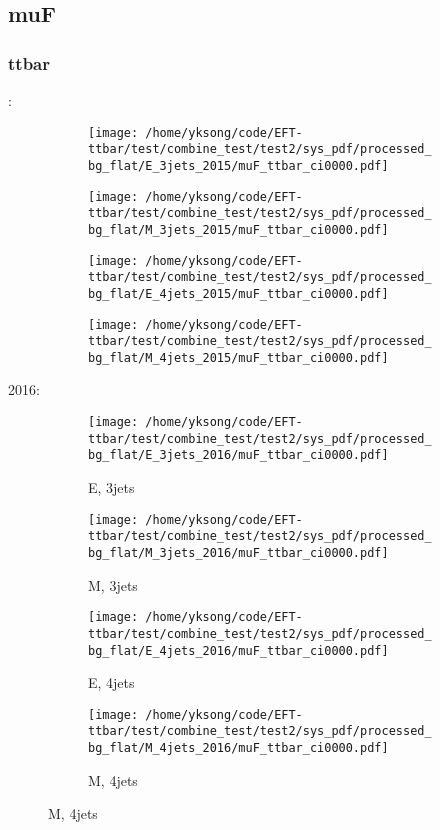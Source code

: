 \documentclass{beamer}
\begin{document}
\subsection{muF}

\begin{frame}
\frametitle{ttbar}
\fontsize{5}{1}:
\begin{figure}
\centering
\begin{subfigure}[b]{0.24\textwidth}
\texttt{[image: /home/yksong/code/EFT-ttbar/test/combine\_test/test2/sys\_pdf/processed\_bg\_flat/E\_3jets\_2015/muF\_ttbar\_ci0000.pdf]}
\end{subfigure}
\begin{subfigure}[b]{0.24\textwidth}
\texttt{[image: /home/yksong/code/EFT-ttbar/test/combine\_test/test2/sys\_pdf/processed\_bg\_flat/M\_3jets\_2015/muF\_ttbar\_ci0000.pdf]}
\end{subfigure}
\begin{subfigure}[b]{0.24\textwidth}
\texttt{[image: /home/yksong/code/EFT-ttbar/test/combine\_test/test2/sys\_pdf/processed\_bg\_flat/E\_4jets\_2015/muF\_ttbar\_ci0000.pdf]}
\end{subfigure}
\begin{subfigure}[b]{0.24\textwidth}
\texttt{[image: /home/yksong/code/EFT-ttbar/test/combine\_test/test2/sys\_pdf/processed\_bg\_flat/M\_4jets\_2015/muF\_ttbar\_ci0000.pdf]}
\end{subfigure}
\end{figure}
2016:
\begin{figure}
\centering
\begin{subfigure}[b]{0.24\textwidth}
\texttt{[image: /home/yksong/code/EFT-ttbar/test/combine\_test/test2/sys\_pdf/processed\_bg\_flat/E\_3jets\_2016/muF\_ttbar\_ci0000.pdf]}
\captionsetup{font=tiny}
\caption{E, 3jets}
\end{subfigure}
\begin{subfigure}[b]{0.24\textwidth}
\texttt{[image: /home/yksong/code/EFT-ttbar/test/combine\_test/test2/sys\_pdf/processed\_bg\_flat/M\_3jets\_2016/muF\_ttbar\_ci0000.pdf]}
\captionsetup{font=tiny}
\caption{M, 3jets}
\end{subfigure}
\begin{subfigure}[b]{0.24\textwidth}
\texttt{[image: /home/yksong/code/EFT-ttbar/test/combine\_test/test2/sys\_pdf/processed\_bg\_flat/E\_4jets\_2016/muF\_ttbar\_ci0000.pdf]}
\captionsetup{font=tiny}
\caption{E, 4jets}
\end{subfigure}
\begin{subfigure}[b]{0.24\textwidth}
\texttt{[image: /home/yksong/code/EFT-ttbar/test/combine\_test/test2/sys\_pdf/processed\_bg\_flat/M\_4jets\_2016/muF\_ttbar\_ci0000.pdf]}
\captionsetup{font=tiny}
\caption{M, 4jets}
\end{subfigure}
\end{figure}
\end{frame}
\end{document}
